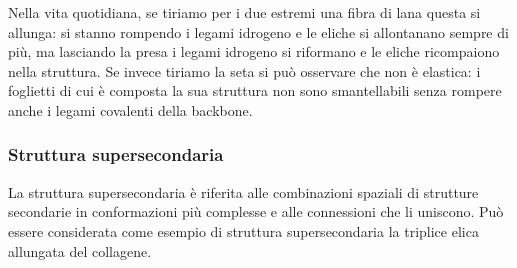 {\par Nella vita quotidiana, se tiriamo per i due estremi una fibra di lana questa si allunga: si stanno rompendo i legami idrogeno e le eliche si allontanano sempre di più, ma lasciando la presa i legami idrogeno si riformano e le eliche ricompaiono nella struttura. Se invece tiriamo la seta si può osservare che non è elastica: i foglietti di cui è composta la sua struttura non sono smantellabili senza rompere anche i legami covalenti della backbone.


\subsubsection{Struttura supersecondaria}
La struttura supersecondaria è riferita alle combinazioni spaziali di strutture secondarie in conformazioni più complesse e alle connessioni che li uniscono. Può essere considerata come esempio di struttura supersecondaria la triplice elica allungata del collagene.

}

